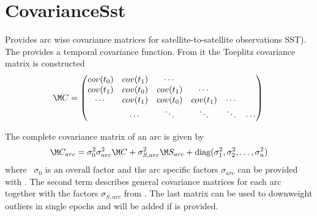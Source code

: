 \section{CovarianceSst}\label{covarianceSstType}
Provides arc wise covariance matrices for satellite-to-satellite observations SST).
The  provides a temporal covariance function.
From it the Toeplitz covariance matrix is constructed
\begin{equation}
  \M C = \begin{pmatrix}
    cov(t_0) & cov(t_1) & \cdots   &          &        &        \\
    cov(t_1) & cov(t_0) & cov(t_1) & \cdots   &        &        \\
    \cdots   & cov(t_1) & cov(t_0) & cov(t_1) & \cdots &        \\
             & \cdots   & \ddots   & \ddots   & \ddots & \cdots \\
  \end{pmatrix} \\
\end{equation}

The complete covariance matrix of an arc is given by
\begin{equation}
  \M C_{arc} = \sigma_0^2 \sigma_{arc}^2 \M C + \sigma_{S,arc}^2 \M S_{arc}+ \text{diag}(\sigma_1^2, \sigma_2^2, \ldots, \sigma_n^2)
\end{equation}
where ~$\sigma_0$ is an overall factor and the arc specific factors $\sigma_{arc}$
can be provided with .
The second term describes general covariance matrices for each arc
 together with the factors $\sigma_{S,arc}$ from .
The last matrix can be used to downweight outliers in single epochs and will be added if
 is provided.




